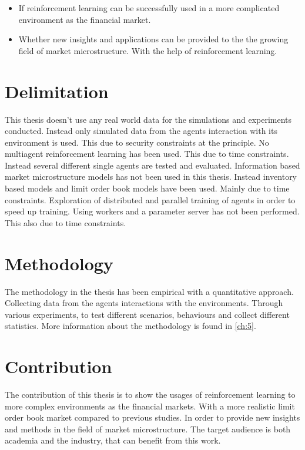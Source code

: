 \documentclass{kththesis}
\theoremstyle{definition}
\begin{document}
\begin{itemize}
    \item If reinforcement learning can be successfully used in a more complicated environment as the financial market. 
    
    \item Whether new insights and applications can be provided to the the growing field of market microstructure. With the help of reinforcement learning.
\end{itemize}


\section{Delimitation}
This thesis doesn't use any real world data for the simulations and experiments conducted. Instead only simulated data from the agents interaction with its environment is used. This due to security constraints at the principle. No multiagent reinforcement learning has been used. This due to time constraints. Instead several different single agents are tested and evaluated. 
\newline
\newline
Information based market microstructure models has not been used in this thesis. Instead inventory based models and limit order book models have been used. Mainly due to time constraints. Exploration of distributed and parallel training of agents in order to speed up training. Using workers and a parameter server has not been performed. This also due to time constraints.

\section{Methodology}
The methodology in the thesis has been empirical with a quantitative approach. Collecting data from the agents interactions with the environments. Through various experiments, to test different scenarios, behaviours and collect different statistics. More information about the methodology is found in \autoref{ch:5}.


\section{Contribution}
The contribution of this thesis is to show the usages of reinforcement learning to more complex environments as the financial markets. With a more realistic limit order book market compared to previous studies. In order to provide new insights and methods in the field of market microstructure. The target audience is both academia and the industry, that can benefit from this work.
\end{document}
